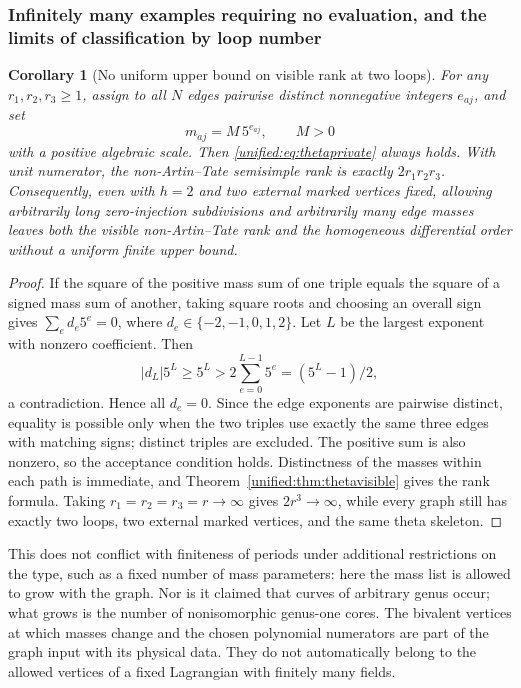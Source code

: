 \documentclass[11pt,a4paper,oneside]{article}
\theoremstyle{plain}
\newtheorem{corollary}[theorem]{Corollary}
\theoremstyle{definition}
\theoremstyle{remark}
\numberwithin{equation}{section}
\begin{document}
\subsubsection{Infinitely many examples requiring no evaluation, and the limits of classification by loop number}
\begin{corollary}[No uniform upper bound on visible rank at two loops]\label{unified:cor:thetaunbounded}
For any $r_1,r_2,r_3\ge1$, assign to all $N$ edges pairwise distinct nonnegative integers $e_{aj}$,
and set
\[
                    m_{aj}=M\,5^{e_{aj}},\qquad M>0
\]
with a positive algebraic scale. Then \eqref{unified:eq:thetaprivate} always holds.
With unit numerator, the non-Artin--Tate semisimple rank is exactly $2r_1r_2r_3$.
Consequently, even with $h=2$ and two external marked vertices fixed,
allowing arbitrarily long zero-injection subdivisions and arbitrarily many edge masses
leaves both the visible non-Artin--Tate rank and the homogeneous differential order without a uniform finite upper bound.
\end{corollary}
\begin{proof}
If the square of the positive mass sum of one triple equals the square of a signed mass sum of another,
taking square roots and choosing an overall sign gives
$\sum_e d_e5^e=0$, where $d_e\in\{-2,-1,0,1,2\}$.
Let $L$ be the largest exponent with nonzero coefficient. Then
\[
 |d_L|5^L\ge5^L>
       2\sum_{e=0}^{L-1}5^e=(5^L-1)/2,
\]
a contradiction. Hence all $d_e=0$. Since the edge exponents are pairwise distinct,
equality is possible only when the two triples use exactly the same three edges with matching signs;
distinct triples are excluded. The positive sum is also nonzero, so the acceptance condition holds.
Distinctness of the masses within each path is immediate, and Theorem~\ref{unified:thm:thetavisible} gives the rank formula.
Taking $r_1=r_2=r_3=r\to\infty$ gives $2r^3\to\infty$,
while every graph still has exactly two loops, two external marked vertices, and the same theta skeleton.
\end{proof}

This does not conflict with finiteness of periods under additional restrictions on the type, such as a fixed number of mass parameters:
here the mass list is allowed to grow with the graph. Nor is it claimed that curves of arbitrary genus occur;
what grows is the number of nonisomorphic genus-one cores.
The bivalent vertices at which masses change and the chosen polynomial numerators are part of the graph input with its physical data.
They do not automatically belong to the allowed vertices of a fixed Lagrangian with finitely many fields.
\end{document}
